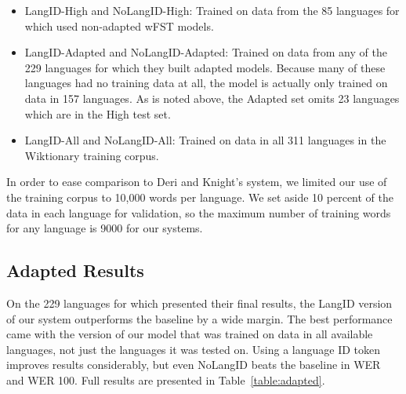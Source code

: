 \documentclass[11pt,letterpaper]{article}
\begin{document}
\begin{itemize}
\item LangID-High and NoLangID-High: Trained on data from the 85 languages for which \citet{deri2016grapheme} used non-adapted wFST models.
\item LangID-Adapted and NoLangID-Adapted: Trained on data from any of the 229 languages for which they built adapted models. Because many of these languages had no training data at all, the model is actually only trained on data in 157 languages. As is noted above, the Adapted set omits 23 languages which are in the High test set.
\item LangID-All and NoLangID-All: Trained on data in all 311 languages in the Wiktionary training corpus.
\end{itemize}

In order to ease comparison to Deri and Knight's system, we limited our use of the training corpus to 10,000 words per language. We set aside 10 percent of the data in each language for validation, so the maximum number of training words for any language is 9000 for our systems.

\subsection{Adapted Results}
On the 229 languages for which  presented their final results, the LangID version of our system outperforms the baseline by a wide margin. The best performance came with the version of our model that was trained on data in all available languages, not just the languages it was tested on. Using a language ID token improves results considerably, but even NoLangID beats the baseline in WER and WER 100. Full results are presented in Table~\ref{table:adapted}.
\end{document}
